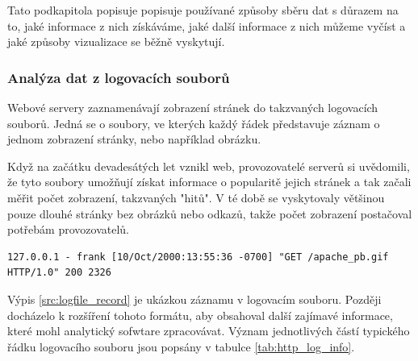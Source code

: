 \documentclass[bc,male,java,dept456]{diploma}						%
\begin{document}
Tato podkapitola popisuje popisuje používané způsoby sběru dat s důrazem na to, jaké informace z nich získáváme, jaké další informace z nich můžeme vyčíst a jaké způ\-so\-by vizualizace se běžně vyskytují.



\subsubsection{Analýza dat z logovacích souborů}

Webové servery zaznamenávají zobrazení stránek do takzvaných logovacích souborů. Jedná se o soubory, ve kterých každý řádek představuje záznam o jednom zobrazení stránky, nebo například obrázku.

Když na začátku devadesátých let vznikl web, provozovatelé serverů si uvědomili, že tyto soubory umožňují získat informace o popularitě jejich stránek a tak začali měřit počet zobrazení, takzvaných "hitů". V té době se vyskytovaly většinou pouze dlouhé stránky bez obrázků nebo odkazů, takže počet zobrazení postačoval potřebám provozovatelů.

\bigskip

\begin{lstlisting}[label=src:logfile_record,caption=Formát logovacího souboru]
127.0.0.1 - frank [10/Oct/2000:13:55:36 -0700] "GET /apache_pb.gif HTTP/1.0" 200 2326
\end{lstlisting}

\bigskip

Výpis \ref{src:logfile_record} je ukázkou záznamu v logovacím souboru. Později docházelo k rozšíření tohoto formátu\cite{clf}, aby obsahoval další zajímavé informace, které mohl analytický sofwtare zpracovávat. Význam jednotlivých částí typického řádku logovacího souboru jsou po\-psá\-ny v tabulce \ref{tab:http_log_info}.
\end{document}
